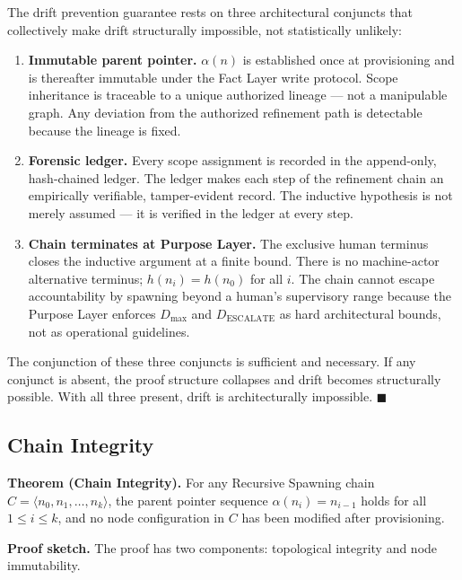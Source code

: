 \medskip
The drift prevention guarantee rests on three architectural conjuncts that collectively make drift structurally impossible, not statistically unlikely:

\begin{enumerate}
    \item[(1)] \textbf{Immutable parent pointer.} $\alpha(n)$ is established once at provisioning and is thereafter immutable under the Fact Layer write protocol. Scope inheritance is traceable to a unique authorized lineage --- not a manipulable graph. Any deviation from the authorized refinement path is detectable because the lineage is fixed.
    \item[(2)] \textbf{Forensic ledger.} Every scope assignment is recorded in the append-only, hash-chained ledger. The ledger makes each step of the refinement chain an empirically verifiable, tamper-evident record. The inductive hypothesis is not merely assumed --- it is verified in the ledger at every step.
    \item[(3)] \textbf{Chain terminates at Purpose Layer.} The exclusive human terminus closes the inductive argument at a finite bound. There is no machine-actor alternative terminus; $h(n_i) = h(n_0)$ for all $i$. The chain cannot escape accountability by spawning beyond a human's supervisory range because the Purpose Layer enforces $D_{\mathrm{max}}$ and $D_{\mathrm{ESCALATE}}$ as hard architectural bounds, not as operational guidelines.
\end{enumerate}

The conjunction of these three conjuncts is sufficient and necessary. If any conjunct is absent, the proof structure collapses and drift becomes structurally possible. With all three present, drift is architecturally impossible. $\blacksquare$

\subsection{Chain Integrity}
\label{sec:rs-chain-integrity}

\medskip
\noindent\textbf{Theorem (Chain Integrity).} For any Recursive Spawning chain $C = \langle n_0, n_1, \ldots, n_k \rangle$, the parent pointer sequence $\alpha(n_i) = n_{i-1}$ holds for all $1 \leq i \leq k$, and no node configuration in $C$ has been modified after provisioning.

\medskip
\noindent\textbf{Proof sketch.} The proof has two components: topological integrity and node immutability.

